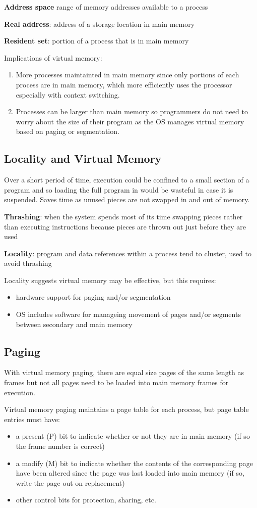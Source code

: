 \documentclass[11pt]{article}
\begin{document}
\textbf{Address space} range of memory addresses available to a process

\textbf{Real address}: address of a storage location in main memory

\textbf{Resident set}: portion of a process that is in main memory

Implications of virtual memory:
\begin{enumerate}
\item More processes maintainted in main memory since only portions of each process are in
main memory, which more efficiently uses the processor especially with context
switching.
\item Processes can be larger than main memory so programmers do not need to worry about
the size of their program as the OS manages virtual memory based on paging or
segmentation.
\end{enumerate}
\subsection{Locality and Virtual Memory}
\label{sec:org4b655ae}
Over a short period of time, execution could be confined to a small section of a program
and so loading the full program in would be wasteful in case it is suspended.
Saves time as unused pieces are not swapped in and out of memory.

\textbf{Thrashing}: when the system spends most of its time swapping pieces rather than executing
instructions because pieces are thrown out just before they are used

\textbf{Locality}: program and data references within a process tend to cluster, used to avoid
thrashing

Locality suggests virtual memory may be effective, but this requires:
\begin{itemize}
\item hardware support for paging and/or segmentation
\item OS includes software for manageing movement of pages and/or segments between secondary
and main memory
\end{itemize}
\subsection{Paging}
\label{sec:orgef347a1}
With virtual memory paging, there are equal size pages of the same length as frames but
not all pages need to be loaded into main memory frames for execution.

Virtual memory paging maintains a page table for each process, but page table entries
must have:
\begin{itemize}
\item a present (P) bit to indicate whether or not they are in main memory (if so
the frame number is correct)
\item a modify (M) bit to indicate whether the contents of the corresponding page have been
altered since the page was last loaded into main memory (if so, write the page out
on replacement)
\item other control bits for protection, sharing, etc.
\end{itemize}
\end{document}
